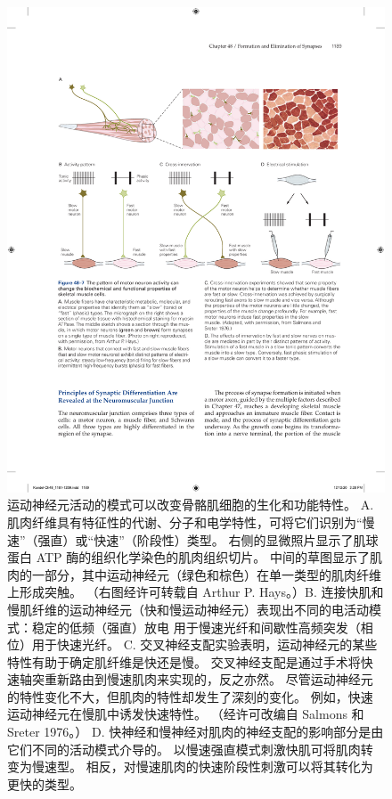 \begin{figure}[htbp]
	\centering
	\includegraphics[width=0.95\linewidth]{chap48/fig_48_7}
	\caption{运动神经元活动的模式可以改变骨骼肌细胞的生化和功能特性。 A. 肌肉纤维具有特征性的代谢、分子和电学特性，可将它们识别为“慢速”（强直）或“快速”（阶段性）类型。 右侧的显微照片显示了肌球蛋白 ATP 酶的组织化学染色的肌肉组织切片。 中间的草图显示了肌肉的一部分，其中运动神经元（绿色和棕色）在单一类型的肌肉纤维上形成突触。 （右图经许可转载自 Arthur P. Hays。）B. 连接快肌和慢肌纤维的运动神经元（快和慢运动神经元）表现出不同的电活动模式：稳定的低频（强直）放电 用于慢速光纤和间歇性高频突发（相位）用于快速光纤。 C. 交叉神经支配实验表明，运动神经元的某些特性有助于确定肌纤维是快还是慢。 交叉神经支配是通过手术将快速轴突重新路由到慢速肌肉来实现的，反之亦然。 尽管运动神经元的特性变化不大，但肌肉的特性却发生了深刻的变化。 例如，快速运动神经元在慢肌中诱发快速特性。 （经许可改编自 Salmons 和 Sreter 1976。） D. 快神经和慢神经对肌肉的神经支配的影响部分是由它们不同的活动模式介导的。 以慢速强直模式刺激快肌可将肌肉转变为慢速型。 相反，对慢速肌肉的快速阶段性刺激可以将其转化为更快的类型。}
	\label{fig:48_7}
\end{figure}



